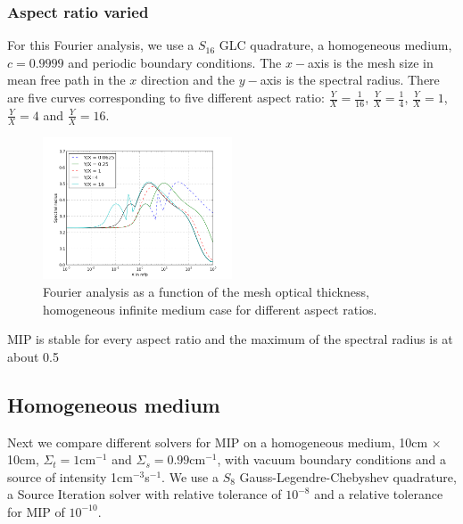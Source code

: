 \subsubsection{Aspect ratio varied}
For this Fourier analysis, we use a $S_{16}$ GLC quadrature, a homogeneous
medium, $c=0.9999$ and periodic boundary conditions. The $x-$axis is the mesh
size in mean free path in the $x$ direction and the $y-$axis is the spectral
radius. There are five curves corresponding to five different aspect ratio:
$\frac{Y}{X}=\frac{1}{16}$, $\frac{Y}{X}=\frac{1}{4}$, $\frac{Y}{X}=1$,
$\frac{Y}{X}=4$ and $\frac{Y}{X}=16$. 
\begin{figure}[H]
\centering
\includegraphics[width=0.5\textwidth]{./Dsa/aspect_ratio_9999}
\caption{Fourier analysis as a function of the mesh optical thickness,
homogeneous infinite medium case for different aspect ratios.}
\end{figure}
MIP is stable for every aspect ratio and the maximum of the spectral radius
is at about 0.5

\subsection{Homogeneous medium}
Next we compare different solvers for MIP on a homogeneous medium, 10cm $\times$
10cm, $\Sigma_t=1$cm$^{-1}$ and $\Sigma_s=0.99$cm$^{-1}$, with vacuum boundary 
conditions and a source of intensity 1cm$^{-3}$s$^{-1}$. We use a $S_8$
Gauss-Legendre-Chebyshev quadrature, a Source Iteration solver with relative
tolerance of $10^{-8}$ and a relative tolerance for MIP of $10^{-10}$.
